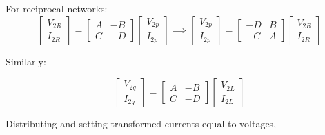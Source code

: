 \documentclass{article}
\begin{document}
For reciprocal networks:
\begin{equation}
\begin{bmatrix}V_{2R}\\I_{2R}\end{bmatrix} = \begin{bmatrix}A & -B\\C&-D\end{bmatrix}\begin{bmatrix}V_{2p}\\I_{2p}\end{bmatrix} \implies \begin{bmatrix}V_{2p}\\I_{2p}\end{bmatrix} = \begin{bmatrix}-D & B\\-C&A\end{bmatrix}\begin{bmatrix}V_{2R}\\I_{2R}\end{bmatrix} 
\end{equation}

Similarly:


\begin{equation}
	\begin{bmatrix}V_{2q}\\I_{2q}\end{bmatrix} = \begin{bmatrix}A & -B\\C&-D\end{bmatrix}\begin{bmatrix}V_{2L}\\I_{2L}\end{bmatrix}
\end{equation}

Distributing and setting transformed currents equal to voltages,
\end{document}
